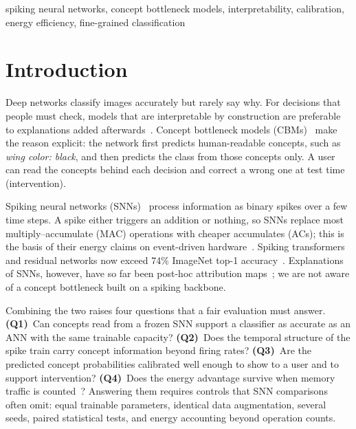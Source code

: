 \documentclass[conference]{IEEEtran}
\begin{document}
\begin{IEEEkeywords}
spiking neural networks, concept bottleneck models, interpretability, calibration, energy efficiency, fine-grained classification
\end{IEEEkeywords}

\section{Introduction}

Deep networks classify images accurately but rarely say why. For decisions that people must check, models that are interpretable by construction are preferable to explanations added afterwards~\cite{rudin2019stop}. Concept bottleneck models (CBMs)~\cite{koh2020concept} make the reason explicit: the network first predicts human-readable concepts, such as \emph{wing color: black}, and then predicts the class from those concepts only. A user can read the concepts behind each decision and correct a wrong one at test time (intervention).

Spiking neural networks (SNNs)~\cite{maass1997networks,roy2019towards} process information as binary spikes over a few time steps. A spike either triggers an addition or nothing, so SNNs replace most multiply--accumulate (MAC) operations with cheaper accumulates (ACs); this is the basis of their energy claims on event-driven hardware~\cite{davies2018loihi}. Spiking transformers and residual networks now exceed 74\% ImageNet top-1 accuracy~\cite{zhou2023spikformer,yao2023spike,shi2024spikingresformer}. Explanations of SNNs, however, have so far been post-hoc attribution maps~\cite{kim2021visual,bitar2023gradient,nguyen2023feature}; we are not aware of a concept bottleneck built on a spiking backbone.

Combining the two raises four questions that a fair evaluation must answer. \textbf{(Q1)}~Can concepts read from a frozen SNN support a classifier as accurate as an ANN with the same trainable capacity? \textbf{(Q2)}~Does the temporal structure of the spike train carry concept information beyond firing rates? \textbf{(Q3)}~Are the predicted concept probabilities calibrated well enough to show to a user and to support intervention? \textbf{(Q4)}~Does the energy advantage survive when memory traffic is counted~\cite{dampfhoffer2023snns}? Answering them requires controls that SNN comparisons often omit: equal trainable parameters, identical data augmentation, several seeds, paired statistical tests, and energy accounting beyond operation counts.
\end{document}
